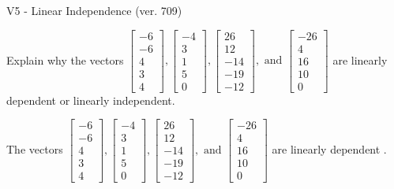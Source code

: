 \begin{exercise}
  \begin{exerciseTitle}V5 - Linear Independence (ver. 709)\end{exerciseTitle}
  \begin{exerciseStatement}
    Explain why the vectors \(\left[\begin{array}{r}
-6 \\
-6 \\
4 \\
3 \\
4
\end{array}\right] , \left[\begin{array}{r}
-4 \\
3 \\
1 \\
5 \\
0
\end{array}\right] , \left[\begin{array}{r}
26 \\
12 \\
-14 \\
-19 \\
-12
\end{array}\right] , \text{ and } \left[\begin{array}{r}
-26 \\
4 \\
16 \\
10 \\
0
\end{array}\right]\) are linearly dependent or linearly independent.	


  \end{exerciseStatement}
  \begin{exerciseAnswer}
   The vectors \(\left[\begin{array}{r}
-6 \\
-6 \\
4 \\
3 \\
4
\end{array}\right] , \left[\begin{array}{r}
-4 \\
3 \\
1 \\
5 \\
0
\end{array}\right] , \left[\begin{array}{r}
26 \\
12 \\
-14 \\
-19 \\
-12
\end{array}\right] , \text{ and } \left[\begin{array}{r}
-26 \\
4 \\
16 \\
10 \\
0
\end{array}\right]\) are 
  	 linearly dependent  .
  


  \end{exerciseAnswer}
\end{exercise}